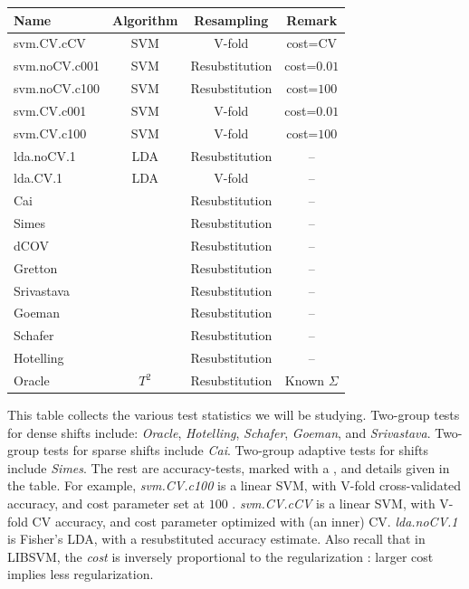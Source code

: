 \documentclass[]{bio}
\begin{document}
\begin{tcolorbox}
	\centering
	\footnotesize
	\begin{tabular}{l|c|c|c}
		Name & Algorithm & Resampling & Remark\\ 
		\hline
		\hline
		\cue svm.CV.cCV 	& SVM & V-fold  & cost=CV \\ 
		\cue svm.noCV.c001 	& SVM & Resubstitution  & cost=$0.01$ \\ 
		\cue svm.noCV.c100 	& SVM & Resubstitution  & cost=$100$ \\ 
		\cue svm.CV.c001	& SVM & V-fold 		    & cost=$0.01$ \\ 
		\cue svm.CV.c100	& SVM & V-fold 		    & cost=$100$ \\ 
		\cue lda.noCV.1 	& LDA & Resubstitution 	&  --\\ 
		\cue lda.CV.1 	& LDA & V-fold 			&  -- \\ 
		Cai & \cite{cai_two-sample_2013} & Resubstitution & -- \\ 
		Simes & \cite{simes1986improved} & Resubstitution & -- \\ 
		dCOV & \cite{szekely2004testing} & Resubstitution & -- \\ 
		Gretton & \cite{gretton_kernel_2012-1} & Resubstitution & -- \\ 
		Srivastava & \cite{srivastava_test_2008} & Resubstitution & -- \\ 
		Goeman & \cite{goeman2006testing} & Resubstitution & -- \\ 
		Schafer & \cite{schafer_shrinkage_2005} & Resubstitution & -- \\ 
		Hotelling & \cite{hotelling_generalization_1931} & Resubstitution & -- \\
		Oracle & $T^2$ & Resubstitution & Known $\Sigma$\\ 
	\end{tabular} 
	\captionsetup{type=table}
	\caption{\footnotesize
		This table collects the various test statistics we will be studying. 
		Two-group tests for dense shifts include: \textit{Oracle}, \textit{Hotelling}, \textit{Schafer}, \textit{Goeman}, and \textit{Srivastava}.
		Two-group tests for sparse shifts include \textit{Cai}.
		Two-group adaptive tests for shifts include \textit{Simes}.
		The rest are accuracy-tests, marked with a \cue, and details given in the table. 	
		For example, \textit{svm.CV.c100} is a linear SVM, with V-fold cross-validated accuracy, and cost parameter set at $100$ \citep{meyer_e1071:_2015}.
		\textit{svm.CV.cCV} is a linear SVM, with V-fold CV accuracy, and cost parameter optimized with (an inner) CV. 
		\textit{lda.noCV.1} is Fisher's LDA, with a resubstituted accuracy estimate.
		Also recall that in LIBSVM, the \emph{cost} is inversely proportional to the regularization \citep{chang2011libsvm}: larger cost implies less regularization. 
	}
	\label{tab:collected}
\end{tcolorbox}
\end{document}
